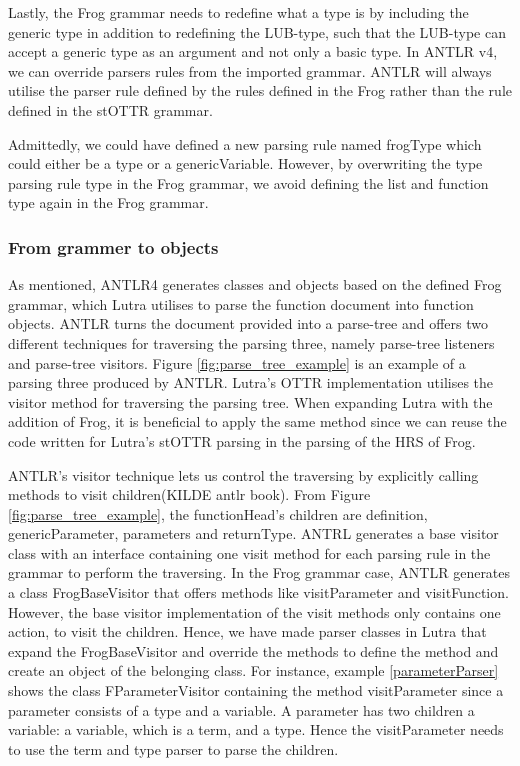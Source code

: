\para


\para
Lastly, the Frog grammar needs to redefine what a type is by including the generic type in addition to redefining the LUB-type, such that the LUB-type can accept a generic type as an argument and not only a basic type. In ANTLR v4, we can override parsers rules from the imported grammar. ANTLR will always utilise the parser rule defined by the rules defined in the Frog rather than the rule defined in the stOTTR grammar.

\para


\para 
Admittedly, we could have defined a new parsing rule named frogType which could either be a type or a genericVariable. However, by overwriting the type parsing rule type in the Frog grammar, we avoid defining the list and function type again in the Frog grammar.

\subsubsection{From grammer to objects}
As mentioned, ANTLR4 generates classes and objects based on the defined Frog grammar, which Lutra utilises to parse the function document into function objects. ANTLR turns the document provided into a parse-tree and offers two different techniques for traversing the parsing three, namely parse-tree listeners and parse-tree visitors. Figure \ref{fig:parse_tree_example} is an example of a parsing three produced by ANTLR. Lutra's OTTR implementation utilises the visitor method for traversing the parsing tree. When expanding Lutra with the addition of Frog, it is beneficial to apply the same method since we can reuse the code written for Lutra's stOTTR parsing in the parsing of the HRS of Frog. 

\para
ANTLR's visitor technique lets us control the traversing by explicitly calling methods to visit children(KILDE antlr book). From Figure \ref{fig:parse_tree_example}, the functionHead's children are definition, genericParameter, parameters and returnType. ANTRL generates a base visitor class with an interface containing one visit method for each parsing rule in the grammar to perform the traversing. In the Frog grammar case, ANTLR generates a class FrogBaseVisitor that offers methods like visitParameter and visitFunction. However, the base visitor implementation of the visit methods only contains one action, to visit the children. Hence, we have made parser classes in Lutra that expand the FrogBaseVisitor and override the methods to define the method and create an object of the belonging class. For instance, example \ref{parameterParser} shows the class FParameterVisitor containing the method visitParameter since a parameter consists of a type and a variable. A parameter has two children a variable: a variable, which is a term, and a type. Hence the visitParameter needs to use the term and type parser to parse the children.

